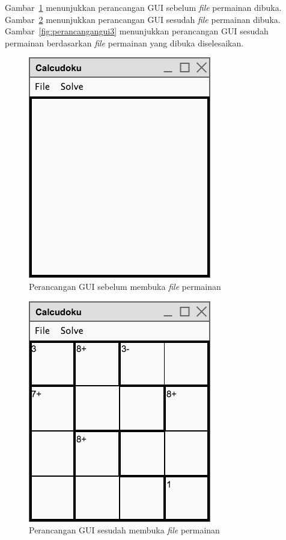 Gambar~\ref{fig:perancangangui1} menunjukkan perancangan GUI sebelum \textit{file} permainan dibuka. Gambar~\ref{fig:perancangangui2} menunjukkan perancangan GUI sesudah \textit{file} permainan dibuka. Gambar~\ref{fig:perancangangui3} menunjukkan perancangan GUI sesudah permainan berdasarkan \textit{file} permainan yang dibuka diselesaikan.

\begin{figure}
\centering
\captionsetup{justification=centering}
\includegraphics[scale=0.5]{Gambar/Perancangan/PerancanganGUI1.png}
\caption[Perancangan GUI sebelum \textit{file} permainan dibuka.]{Perancangan GUI sebelum membuka \textit{file} permainan}
\label{fig:perancangangui1}
\end{figure}

\begin{figure}
\centering
\captionsetup{justification=centering}
\includegraphics[scale=0.5]{Gambar/Perancangan/PerancanganGUI2.png}
\caption[Perancangan GUI sesudah \textit{file} permainan dibuka.]{Perancangan GUI sesudah membuka \textit{file} permainan}
\label{fig:perancangangui2}
\end{figure}

